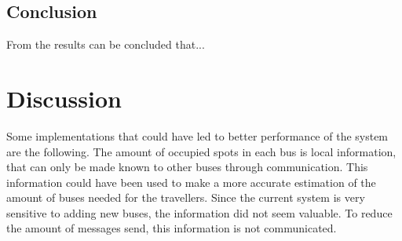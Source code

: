 \documentclass[a4paper]{article}
\begin{document}
\subsection{Conclusion}
From the results can be concluded that...

\section{Discussion}
Some implementations that could have led to better performance of the system are the following.
\newline
The amount of occupied spots in each bus is local information, that can only be made known to other buses through communication. This information could have been used to make a more accurate estimation of the amount of buses needed for the travellers. Since the current system is very sensitive to adding new buses, the information did not seem valuable. To reduce the amount of messages send, this information is not communicated.

\newpage
\onecolumn


\end{document}
